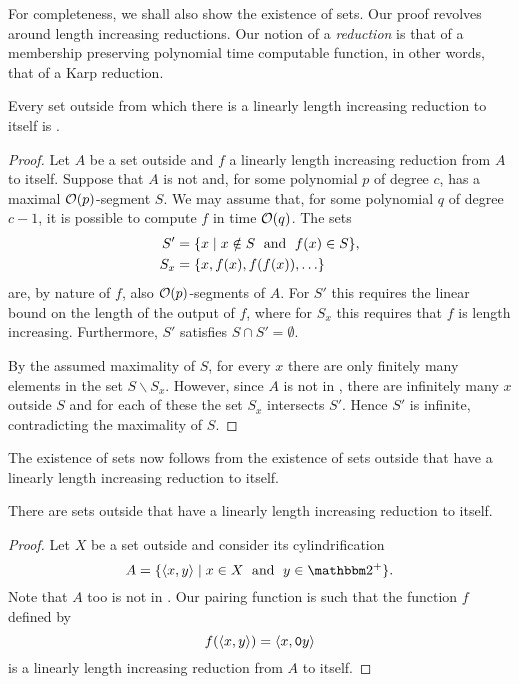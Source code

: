 For completeness, we shall also show the existence of  sets.
Our proof revolves around length increasing reductions.
Our notion of a \emph{reduction} is that of a membership preserving polynomial time computable function, in other words, that of a Karp reduction.
\begin{theorem}
  Every set outside  from which there is a linearly length increasing reduction to itself is .
\end{theorem}
\begin{proof}
  Let $A$ be a set outside  and $f$ a linearly length increasing reduction from $A$ to itself.
  Suppose that $A$ is not  and, for some polynomial $p$ of degree $c$, has a maximal $\operatorname{\mathcal{O}}(p)$-segment $S$.
  We may assume that, for some polynomial $q$ of degree $c - 1$, it is possible to compute $f$ in time $\operatorname{\mathcal{O}}(q)$.
  The sets
  \begin{align*}
    S' &= \{x \;{|}\; x \notin S \;\text{ and }\; f(x) \in S\}, \\
    S_x &= \{x, f(x), f(f(x)), \ldots\}
  \end{align*}
  are, by nature of $f$, also $\operatorname{\mathcal{O}}(p)$-segments of $A$.
  For $S'$ this requires the linear bound on the length of the output of $f$, where for $S_x$ this requires that $f$ is length increasing.
  Furthermore, $S'$ satisfies $S \cap S' = \emptyset$.

  By the assumed maximality of $S$, for every $x$ there are only finitely many elements in the set $S \backslash S_x$.
  However, since $A$ is not in , there are infinitely many $x$ outside $S$ and for each of these the set $S_x$ intersects $S'$.
  Hence $S'$ is infinite, contradicting the maximality of $S$.
\end{proof}

The existence of  sets now follows from the existence of sets outside  that have a linearly length increasing reduction to itself.
\begin{lemma}
  There are sets outside  that have a linearly length increasing reduction to itself.
\end{lemma}
\begin{proof}
  Let $X$ be a set outside  and consider its cylindrification
  \begin{equation*}
    A \deq \{\pair{x}{y} \st x \in X \reland y \in \binary^+\}.
  \end{equation*}
  Note that $A$ too is not in .
  Our pairing function is such that the function $f$ defined by
  \begin{equation*}
    f({\langle x, y\rangle}) = {\langle x, \textnormal{\texttt{0}}y\rangle}
  \end{equation*}
  is a linearly length increasing reduction from $A$ to itself.
\end{proof}


